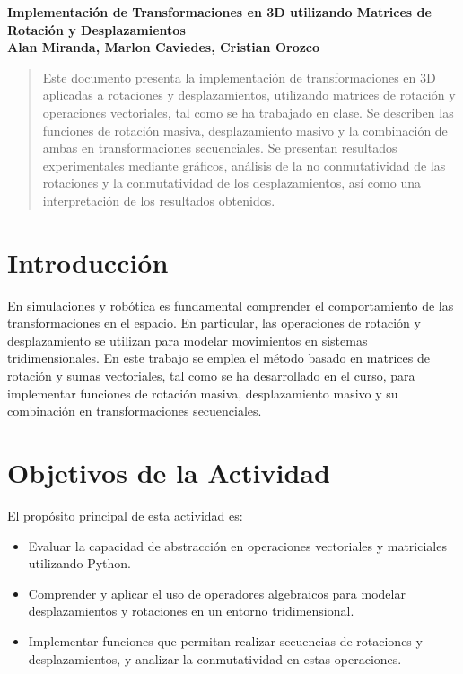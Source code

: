 \documentclass[a4paper, 10pt]{article}
\begin{document}
\begin{center}

\LARGE
\textbf{Implementación de Transformaciones en 3D utilizando Matrices de Rotación y Desplazamientos}\\[6pt]
\small
\textbf {Alan Miranda, Marlon Caviedes, Cristian Orozco}\\[6pt]

\end{center}

\begin{abstract}
Este documento presenta la implementación de transformaciones en 3D aplicadas a rotaciones y desplazamientos, utilizando matrices de rotación y operaciones vectoriales, tal como se ha trabajado en clase. Se describen las funciones de rotación masiva, desplazamiento masivo y la combinación de ambas en transformaciones secuenciales. Se presentan resultados experimentales mediante gráficos, análisis de la no conmutatividad de las rotaciones y la conmutatividad de los desplazamientos, así como una interpretación de los resultados obtenidos. 
\end{abstract}

\section{Introducción}
En simulaciones y robótica es fundamental comprender el comportamiento de las transformaciones en el espacio. En particular, las operaciones de rotación y desplazamiento se utilizan para modelar movimientos en sistemas tridimensionales. En este trabajo se emplea el método basado en matrices de rotación y sumas vectoriales, tal como se ha desarrollado en el curso, para implementar funciones de rotación masiva, desplazamiento masivo y su combinación en transformaciones secuenciales.

\section{Objetivos de la Actividad}
El propósito principal de esta actividad es:
\begin{itemize}
    \item Evaluar la capacidad de abstracción en operaciones vectoriales y matriciales utilizando Python.
    \item Comprender y aplicar el uso de operadores algebraicos para modelar desplazamientos y rotaciones en un entorno tridimensional.
    \item Implementar funciones que permitan realizar secuencias de rotaciones y desplazamientos, y analizar la conmutatividad en estas operaciones.
\end{itemize}
\end{document}
